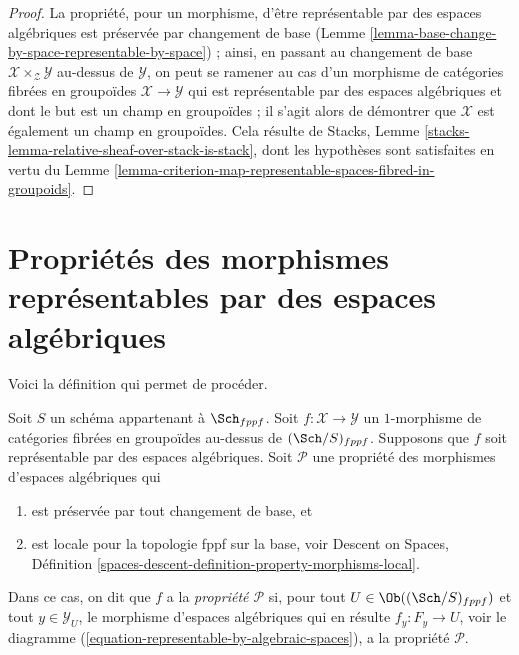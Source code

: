\begin{proof}
La propriété, pour un morphisme, d'être représentable par des espaces algébriques
est préservée par changement de base
(Lemme \ref{lemma-base-change-by-space-representable-by-space}) ;
ainsi, en passant au changement de base
$\mathcal{X} \times_\mathcal{Z} \mathcal{Y}$ au-dessus de $\mathcal{Y}$,
on peut se ramener au cas d'un morphisme de catégories
fibrées en groupoïdes $\mathcal{X} \to \mathcal{Y}$
qui est représentable par des espaces algébriques et
dont le but est un champ en groupoïdes ; il s'agit alors de démontrer
que $\mathcal{X}$ est également un champ en groupoïdes.
Cela résulte de Stacks, Lemme
\ref{stacks-lemma-relative-sheaf-over-stack-is-stack},
dont les hypothèses sont satisfaites en vertu du
Lemme \ref{lemma-criterion-map-representable-spaces-fibred-in-groupoids}.
\end{proof}







\section{Propriétés des morphismes représentables par des espaces algébriques}
\label{section-representable-properties}

\noindent
Voici la définition qui permet de procéder.

\begin{definition}
\label{definition-relative-representable-property}
Soit $S$ un schéma appartenant à $\Sch_{fppf}$.
Soit $f : \mathcal{X} \to \mathcal{Y}$ un $1$-morphisme
de catégories fibrées en groupoïdes au-dessus de $(\Sch/S)_{fppf}$.
Supposons que $f$ soit représentable par des espaces algébriques.
Soit $\mathcal{P}$ une propriété des morphismes d'espaces algébriques qui
\begin{enumerate}
\item est préservée par tout changement de base, et
\item est locale pour la topologie fppf sur la base, voir
Descent on Spaces,
Définition \ref{spaces-descent-definition-property-morphisms-local}.
\end{enumerate}
Dans ce cas, on dit que $f$ a la {\it propriété $\mathcal{P}$} si, pour tout
$U \in \Ob((\Sch/S)_{fppf})$ et
tout $y \in \mathcal{Y}_U$, le morphisme d'espaces algébriques qui en résulte
$f_y : F_y \to U$, voir le
diagramme (\ref{equation-representable-by-algebraic-spaces}),
a la propriété $\mathcal{P}$.
\end{definition}

